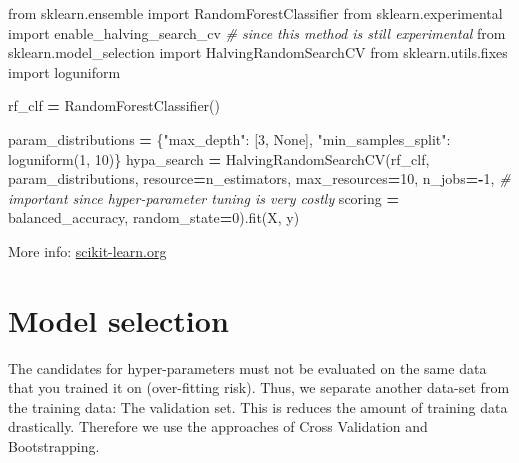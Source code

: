 \documentclass[
]{book}
\newenvironment{Shaded}{\begin{snugshade}}{\end{snugshade}}
\newcommand{\CommentTok}[1]{\textcolor[rgb]{0.56,0.35,0.01}{\textit{#1}}}
\newcommand{\DecValTok}[1]{\textcolor[rgb]{0.00,0.00,0.81}{#1}}
\newcommand{\ImportTok}[1]{#1}
\newcommand{\NormalTok}[1]{#1}
\newcommand{\OperatorTok}[1]{\textcolor[rgb]{0.81,0.36,0.00}{\textbf{#1}}}
\newcommand{\StringTok}[1]{\textcolor[rgb]{0.31,0.60,0.02}{#1}}
\newcommand{\VariableTok}[1]{\textcolor[rgb]{0.00,0.00,0.00}{#1}}
\begin{document}
\begin{Shaded}
\begin{Highlighting}[]
\ImportTok{from}\NormalTok{ sklearn.ensemble }\ImportTok{import}\NormalTok{ RandomForestClassifier}
\ImportTok{from}\NormalTok{ sklearn.experimental }\ImportTok{import}\NormalTok{ enable\_halving\_search\_cv  }\CommentTok{\# since this method is still experimental}
\ImportTok{from}\NormalTok{ sklearn.model\_selection }\ImportTok{import}\NormalTok{ HalvingRandomSearchCV}
\ImportTok{from}\NormalTok{ sklearn.utils.fixes }\ImportTok{import}\NormalTok{ loguniform}

\NormalTok{rf\_clf }\OperatorTok{=}\NormalTok{ RandomForestClassifier()}

\NormalTok{param\_distributions }\OperatorTok{=}\NormalTok{ \{}\StringTok{"max\_depth"}\NormalTok{: [}\DecValTok{3}\NormalTok{, }\VariableTok{None}\NormalTok{],}
                       \StringTok{"min\_samples\_split"}\NormalTok{: loguniform(}\DecValTok{1}\NormalTok{, }\DecValTok{10}\NormalTok{)\}}
\NormalTok{hypa\_search }\OperatorTok{=}\NormalTok{ HalvingRandomSearchCV(rf\_clf, param\_distributions,}
\NormalTok{                               resource}\OperatorTok{=}\StringTok{\textquotesingle{}n\_estimators\textquotesingle{}}\NormalTok{,}
\NormalTok{                               max\_resources}\OperatorTok{=}\DecValTok{10}\NormalTok{,}
\NormalTok{                               n\_jobs}\OperatorTok{={-}}\DecValTok{1}\NormalTok{, }\CommentTok{\# important since hyper{-}parameter tuning is very costly}
\NormalTok{                               scoring }\OperatorTok{=} \StringTok{\textquotesingle{}balanced\_accuracy\textquotesingle{}}\NormalTok{,}
\NormalTok{                               random\_state}\OperatorTok{=}\DecValTok{0}\NormalTok{).fit(X, y)}
\end{Highlighting}
\end{Shaded}

More info:
\href{https://scikit-learn.org/stable/modules/grid_search.html\#searching-for-optimal-parameters-with-successive-halving}{scikit-learn.org}\\

\hypertarget{model-selection}{%
\section{Model selection}\label{model-selection}}

The candidates for hyper-parameters must not be evaluated on the same
data that you trained it on (over-fitting risk). Thus, we separate
another data-set from the training data: The validation set. This is
reduces the amount of training data drastically. Therefore we use the
approaches of Cross Validation and Bootstrapping.
\end{document}
